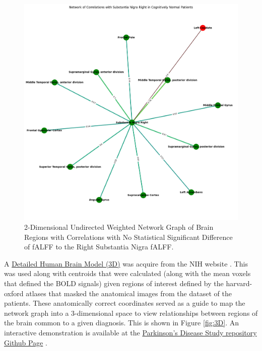 \documentclass[12pt]{article}
\begin{document}
\begin{figure}[h]  %
    \centering
    \includegraphics[width=\textwidth]{"../img/statistically_significant_correlated_regions_sn_cogn_pdd_graph.png"}  %
    \caption{2-Dimensional Undirected Weighted Network Graph of Brain Regions with Correlations with No Statistical Significant Difference of fALFF to the Right Substantia Nigra fALFF.}
    \label{fig:2D}  %
\end{figure}

\FloatBarrier

A \href{https://3d.nih.gov/entries/3DPX-021161}{Detailed Human Brain Model (3D)} was acquire from the NIH website \cite{NIH3DPX021161}. This was used along with centroids that were calculated (along with the mean voxels that defined the BOLD signals) given regions of interest defined by the harvard-oxford atlases that masked the anatomical images from the dataset of the patients. These anatomically correct coordinates served as a guide to map the network graph into a 3-dimensional space to view relationships between regions of the brain common to a given diagnosis. This is shown in Figure \ref{fig:3D}. An interactive demonstration is available at the \href{https://efwoods.github.io/Parkinsons_Disease_Study/}{Parkinson's Disease Study repository Github Page} \cite{WoodsParkinsonsStudy}.
\end{document}
